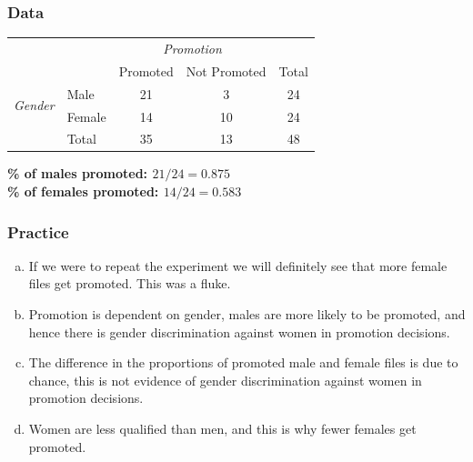 \documentclass[slidestop,compress,mathserif]{beamer}
\newcommand{\soln}[1]{\textit{#1}}
\begin{document}

\begin{frame}
\frametitle{Data}


\begin{center}
\begin{tabular}{ll  cc c} 
  		&				& \multicolumn{2}{c}{\textit{Promotion}} \\
\cline{3-4}
							&			& Promoted	& Not Promoted 	& Total	\\
\cline{2-5}
\multirow{2}{*}{\textit{Gender	}}	&Male 		& 21	 	& 3		& 24 	\\
							&Female		& 14	 	& 10 	 	& 24 \\
\cline{2-5}
							&Total		& 35		& 13		& 48 \\
\end{tabular}
\end{center}

\pause

\textbf{\% of males promoted: $21 / 24 = 0.875$} \\
\textbf{\% of females promoted: $14 / 24 = 0.583$}

\end{frame}


\begin{frame}
\frametitle{Practice}


\begin{enumerate}[(a)]

\item If we were to repeat the experiment we will definitely see that more female files get promoted. This was a fluke.

\item Promotion is dependent on gender, males are more likely to be promoted, and hence there is gender discrimination against women in promotion decisions. \soln{}

\item The difference in the proportions of promoted male and female files is due to chance, this is not evidence of gender discrimination against women in promotion decisions. \soln{}

\item Women are less qualified than men, and this is why fewer females get promoted.

\end{enumerate}

\end{frame}
\end{document}
